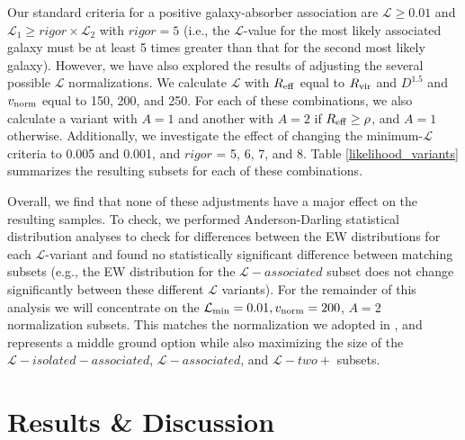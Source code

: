 \documentclass[twocolumn,tighten]{aastex62}
\begin{document}
Our standard criteria for a positive galaxy-absorber association are $\mathcal{L} \geq 0.01$ and $\mathcal{L}_1 \geq rigor \times \mathcal{L}_2$ with $rigor =5$ (i.e., the $\mathcal{L}$-value for the most likely associated galaxy must be at least 5 times greater than that for the second most likely galaxy). However, we have also explored the results of adjusting the several possible $\mathcal{L}$ normalizations. We calculate $\mathcal{L}$ with $R_{\rm eff}$ equal to $R_{\rm vir}$ and $D^{1.5}$ and $v_{\rm norm}$ equal to 150, 200, and 250. For each of these combinations, we also calculate a variant with $A =1$ and another with $A = 2$ if $R_{\rm eff} \ge \rho$, and $A=1$ otherwise. Additionally, we investigate the effect of changing the minimum-$\mathcal{L}$ criteria to 0.005 and 0.001, and $rigor$ = 5, 6, 7, and 8. Table \ref{likelihood_variants} summarizes the resulting subsets for each of these combinations. 

Overall, we find that none of these adjustments have a major effect on the resulting samples. To check, we performed Anderson-Darling statistical distribution analyses to check for differences between the EW distributions for each $\mathcal{L}$-variant and found no statistically significant difference between matching subsets (e.g., the EW distribution for the $\mathcal{L}-associated$ subset does not change significantly between these different $\mathcal{L}$ variants). For the remainder of this analysis we will concentrate on the $\mathcal{L}_{\rm min} = 0.01, v_{\rm norm} = 200$, $A = 2$ normalization subsets. This matches the normalization we adopted in \cite{french2017}, and represents a middle ground option while also maximizing the size of the $\mathcal{L}-isolated-associated$, $\mathcal{L}-associated$, and $\mathcal{L}-two+$ subsets.





\section{Results \& Discussion}
\end{document}
